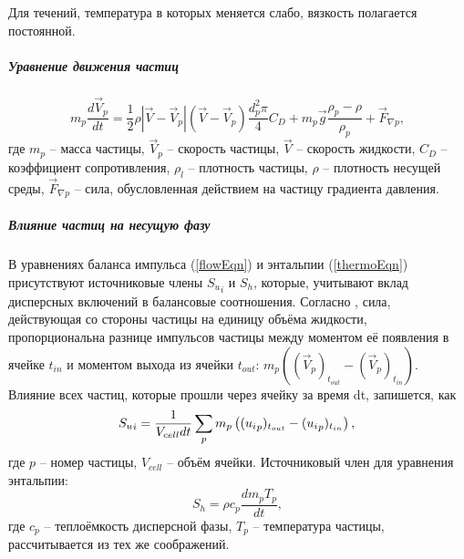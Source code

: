 				Для течений, температура в которых меняется слабо, вязкость полагается постоянной.
		\subparagraph{Уравнение движения частиц}
			\begin{equation}
				m_p \frac{d \vec{V}_p}{dt} = \frac{1}{2}\rho |\vec{V}-\vec{V}_p|(\vec{V}-\vec{V}_p)\frac{d_p^2 \pi}{4}C_D + m_p \vec{g}\frac{\rho_p-\rho}{\rho_p} + \vec{F}_{\nabla{p}},		
			\end{equation}
			где $m_p$ -- масса частицы, $\vec{V}_p$ -- скорость частицы, $\vec{V}$ -- скорость жидкости, $C_D$ -- коэффициент сопротивления, $\rho_l$ -- плотность частицы, $\rho$ -- плотность несущей среды, $\vec{F}_{\nabla{p}}$ -- сила, обусловленная действием на частицу градиента давления.
		\subparagraph{Влияние частиц на несущую фазу\\}
		
		В уравнениях баланса импульса (\ref{flowEqn}) и энтальпии (\ref{thermoEqn}) присутствуют источниковые члены ${S_u}_i$ и $S_h$, которые, учитывают вклад дисперсных включений в балансовые соотношения. Согласно \cite{Vallier}, сила, действующая со стороны частицы на единицу объёма жидкости, пропорциональна разнице импульсов частицы между моментом её появления в ячейке $t_{in}$ и моментом выхода из ячейки $t_{out}$: $m_p\left( (\vec{V}_p)_{t_{out}} - (\vec{V}_p)_{t_{in}}\right)$. Влияние всех частиц, которые прошли через ячейку за время dt, запишется, как
		\begin{equation}
			{S_u}_i = \frac{1}{V_{cell}dt} \sum_p m_p \left( ({u_i}_p)_{t_{out}} - ({u_i}_p)_{t_{in}}\right),\\
		\end{equation}
		где $p$ -- номер частицы, $V_{cell}$ -- объём ячейки. Источниковый член для уравнения энтальпии:
		\begin{equation}
			S_h = \rho c_p \frac{d m_p T_p}{dt},
		\end{equation}
		где $c_p$ -- теплоёмкость дисперсной фазы, $T_p$ -- температура частицы, рассчитывается из тех же соображений.
